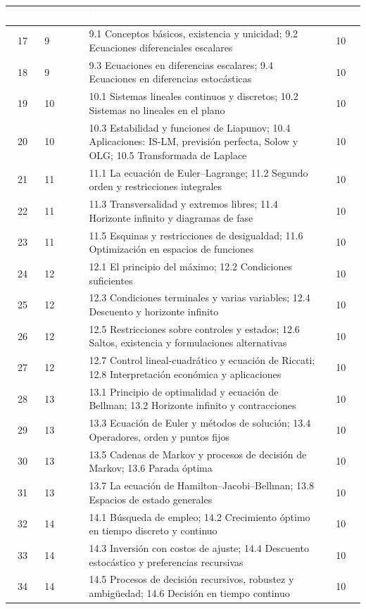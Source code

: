 \documentclass[11pt,a4paper]{article}
\renewcommand{\arraystretch}{1.3}
\newcommand{\cab}[1]{\textcolor{white}{\sffamily\bfseries #1}}
\newcommand{\filasalternas}{\rowcolors{2}{white}{tonoPalido}}
\begin{document}
{\medskip
{\filasalternas
\renewcommand{\arraystretch}{1.1}\noindent\begin{tabularx}{\textwidth}{clXc}
\toprule
\rowcolor{tonoOscuro}\cab{Sem.} & \cab{Bloque} & \cab{Temas} & \cab{Horas} \\
\midrule
17 & 9 & 9.1 Conceptos básicos, existencia y unicidad; 9.2 Ecuaciones diferenciales escalares & 10 \\
18 & 9 & 9.3 Ecuaciones en diferencias escalares; 9.4 Ecuaciones en diferencias estocásticas & 10 \\
\midrule
19 & 10 & 10.1 Sistemas lineales continuos y discretos; 10.2 Sistemas no lineales en el plano & 10 \\
20 & 10 & 10.3 Estabilidad y funciones de Liapunov; 10.4 Aplicaciones: IS-LM, previsión perfecta, Solow y OLG; 10.5 Transformada de Laplace & 10 \\
\midrule
21 & 11 & 11.1 La ecuación de Euler--Lagrange; 11.2 Segundo orden y restricciones integrales & 10 \\
22 & 11 & 11.3 Transversalidad y extremos libres; 11.4 Horizonte infinito y diagramas de fase & 10 \\
23 & 11 & 11.5 Esquinas y restricciones de desigualdad; 11.6 Optimización en espacios de funciones & 10 \\
\midrule
24 & 12 & 12.1 El principio del máximo; 12.2 Condiciones suficientes & 10 \\
25 & 12 & 12.3 Condiciones terminales y varias variables; 12.4 Descuento y horizonte infinito & 10 \\
26 & 12 & 12.5 Restricciones sobre controles y estados; 12.6 Saltos, existencia y formulaciones alternativas & 10 \\
27 & 12 & 12.7 Control lineal-cuadrático y ecuación de Riccati; 12.8 Interpretación económica y aplicaciones & 10 \\
\midrule
28 & 13 & 13.1 Principio de optimalidad y ecuación de Bellman; 13.2 Horizonte infinito y contracciones & 10 \\
29 & 13 & 13.3 Ecuación de Euler y métodos de solución; 13.4 Operadores, orden y puntos fijos & 10 \\
30 & 13 & 13.5 Cadenas de Markov y procesos de decisión de Markov; 13.6 Parada óptima & 10 \\
31 & 13 & 13.7 La ecuación de Hamilton--Jacobi--Bellman; 13.8 Espacios de estado generales & 10 \\
\midrule
32 & 14 & 14.1 Búsqueda de empleo; 14.2 Crecimiento óptimo en tiempo discreto y continuo & 10 \\
33 & 14 & 14.3 Inversión con costos de ajuste; 14.4 Descuento estocástico y preferencias recursivas & 10 \\
34 & 14 & 14.5 Procesos de decisión recursivos, robustez y ambigüedad; 14.6 Decisión en tiempo continuo & 10 \\
\bottomrule
\end{tabularx}
}
}
\end{document}
